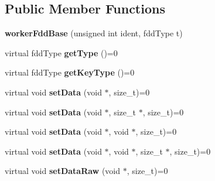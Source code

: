 \subsection*{Public Member Functions}
\begin{DoxyCompactItemize}
\item 
\hypertarget{classfaster_1_1workerFddBase_a8e25e46286deed01d3131e2ac7fb7560}{}{\bfseries worker\+Fdd\+Base} (unsigned int ident, fdd\+Type t)\label{classfaster_1_1workerFddBase_a8e25e46286deed01d3131e2ac7fb7560}

\item 
\hypertarget{classfaster_1_1workerFddBase_a60a32cfcbe768ca3ffa64b98389441ee}{}virtual fdd\+Type {\bfseries get\+Type} ()=0\label{classfaster_1_1workerFddBase_a60a32cfcbe768ca3ffa64b98389441ee}

\item 
\hypertarget{classfaster_1_1workerFddBase_aece939bd2cd9652a7fb49d2dca865e3d}{}virtual fdd\+Type {\bfseries get\+Key\+Type} ()=0\label{classfaster_1_1workerFddBase_aece939bd2cd9652a7fb49d2dca865e3d}

\item 
\hypertarget{classfaster_1_1workerFddBase_a325bd99069264118804eb29ef808d37c}{}virtual void {\bfseries set\+Data} (void $\ast$, size\+\_\+t)=0\label{classfaster_1_1workerFddBase_a325bd99069264118804eb29ef808d37c}

\item 
\hypertarget{classfaster_1_1workerFddBase_a7301d03d82d61aae044b1e53d1595338}{}virtual void {\bfseries set\+Data} (void $\ast$, size\+\_\+t $\ast$, size\+\_\+t)=0\label{classfaster_1_1workerFddBase_a7301d03d82d61aae044b1e53d1595338}

\item 
\hypertarget{classfaster_1_1workerFddBase_ab3de9c6bb71c998d51482be316da4dce}{}virtual void {\bfseries set\+Data} (void $\ast$, void $\ast$, size\+\_\+t)=0\label{classfaster_1_1workerFddBase_ab3de9c6bb71c998d51482be316da4dce}

\item 
\hypertarget{classfaster_1_1workerFddBase_aa80255f187115a003f2e869366ecb6b6}{}virtual void {\bfseries set\+Data} (void $\ast$, void $\ast$, size\+\_\+t $\ast$, size\+\_\+t)=0\label{classfaster_1_1workerFddBase_aa80255f187115a003f2e869366ecb6b6}

\item 
\hypertarget{classfaster_1_1workerFddBase_ac02bc5670916dd922ea8d5c505b08899}{}virtual void {\bfseries set\+Data\+Raw} (void $\ast$, size\+\_\+t)=0\label{classfaster_1_1workerFddBase_ac02bc5670916dd922ea8d5c505b08899}


\end{DoxyCompactItemize}
